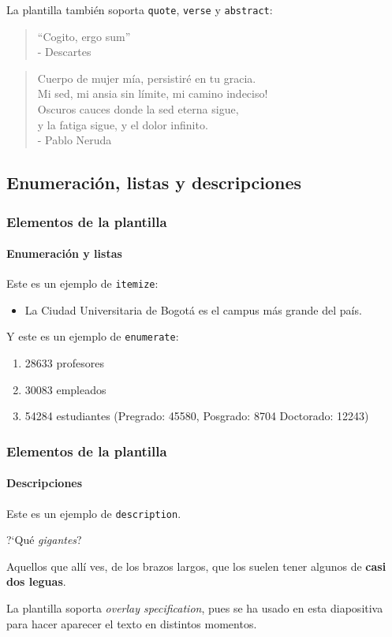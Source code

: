 \documentclass[aspectratio=169,usenames,dvipsnames,spanish]{beamer}
\begin{document}
\begin{frame}
    La plantilla también soporta \texttt{quote}, \texttt{verse} y \texttt{abstract}:

\begin{center}
\begin{quote}
    ``Cogito, ergo sum''\\
    \raggedleft \rm{- Descartes}
\end{quote}
\end{center}


\begin{verse}
    Cuerpo de mujer mía, persistiré en tu gracia.\\
Mi sed, mi ansia sin límite, mi camino indeciso!\\
Oscuros cauces donde la sed eterna sigue,\\
y la fatiga sigue, y el dolor infinito.\\
\raggedleft \rm{- Pablo Neruda}
\end{verse}
\begin{abstract}
    Ejemplo de un resumen en Beamer.
\end{abstract}
\end{frame}

\subsection{Enumeración, listas y descripciones}


\begin{frame}
\frametitle{Elementos de la plantilla}
\framesubtitle{Enumeración y listas}

Este es un ejemplo de \texttt{itemize}:
\begin{itemize}
	\item La Ciudad Universitaria de Bogotá es el campus más grande del país.
\end{itemize}
Y este es un ejemplo de \texttt{enumerate}:
\begin{enumerate} 
    \item 28633 profesores
    \item 30083 empleados
    \item 54284 estudiantes (Pregrado: 45580, Posgrado: 8704 Doctorado: 12243)
\end{enumerate}
\end{frame}

\begin{frame}
\frametitle{Elementos de la plantilla}
\framesubtitle{Descripciones}

Este es un ejemplo de \texttt{description}.

\begin{description}
\item<1->[Sancho] ?`Qué \emph{gigantes}?
\item<2->[Quijote] Aquellos que allí ves, de los brazos largos, que los suelen tener algunos de \textbf{casi dos leguas}. 
\end{description}

La plantilla soporta \emph{overlay specification}, pues se ha usado en esta diapositiva para hacer aparecer el texto en distintos momentos.
\end{frame}
\end{document}
